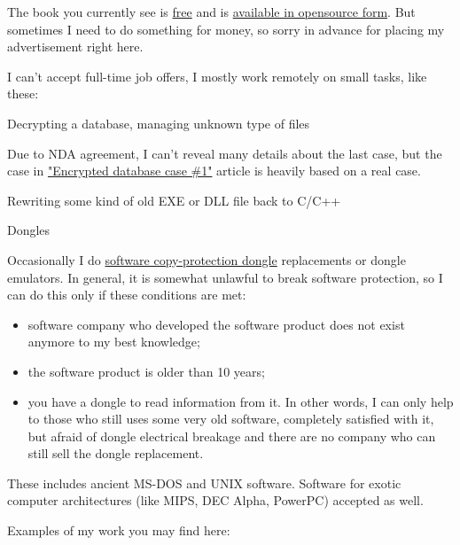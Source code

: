 \vspace*{\fill}

\Huge%
	\ESph{}%
	\PTBRph{}%
	\DEph{}%
	\PLph{}%
	\ITAph{}
\normalsize

\bigskip
\bigskip
\bigskip

\ifdefined\ENGLISH

The book you currently see is \href{http://beginners.re/}{free} and is \href{https://github.com/dennis714/RE-for-beginners/}{available in opensource form}.
But sometimes I need to do something for money, so sorry in advance for placing my advertisement right here.

I can't accept full-time job offers, I mostly work remotely on small tasks, like these:

\Large Decrypting a database, managing unknown type of files \normalsize

Due to NDA agreement, I can't reveal many details about the last case, but the case in \href{http://yurichev.com/blog/encrypted_DB_case_1/}{"Encrypted database case \#1"} article is heavily based on a real case.

\Large Rewriting some kind of old EXE or DLL file back to C/C++ \normalsize

\Large Dongles \normalsize

Occasionally I do \href{https://en.wikipedia.org/wiki/Software_protection_dongle}{software copy-protection dongle} replacements or dongle emulators. In general, it is somewhat unlawful to break software protection, so I can do this only if these conditions are met:

\begin{itemize}
\item software company who developed the software product does not exist anymore to my best knowledge;
\item the software product is older than 10 years;
\item you have a dongle to read information from it. In other words, I can only help to those who still uses some very old software, completely satisfied with it, but afraid of dongle electrical breakage and there are no company who can still sell the dongle replacement. 
\end{itemize}

These includes ancient MS-DOS and UNIX software. Software for exotic computer architectures (like MIPS, DEC Alpha, PowerPC) accepted as well.

Examples of my work you may find here:

